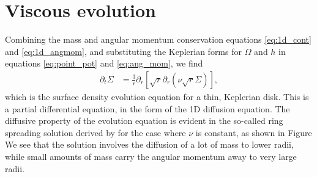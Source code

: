 \section{Viscous evolution}


Combining the mass and angular momentum conservation equations \ref{eq:1d_cont} and \ref{eq:1d_angmom}, and substituting the Keplerian forms for $\Omega$ and $h$ in equations \ref{eq:point_pot} and \ref{eq:ang_mom}, we find
\begin{align}
    \partial_t \Sigma &= \frac{3}{r} \partial_r \left[ \sqrt{r} \partial_r \left( \nu \sqrt{r} \Sigma  \right)  \right] \label{eq:1d_evol},
\end{align}
which is the surface density evolution equation for a thin, Keplerian disk. 
This is a partial differential equation, in the form of the 1D diffusion equation.
The diffusive property of the evolution equation is evident in the so-called ring spreading solution derived by \citet{lynden-bell1974} for the case where $\nu$ is constant, as shown in Figure %
We see that the solution involves the diffusion of a lot of mass to lower radii, while small amounts of mass carry the angular momentum away to very large radii.

